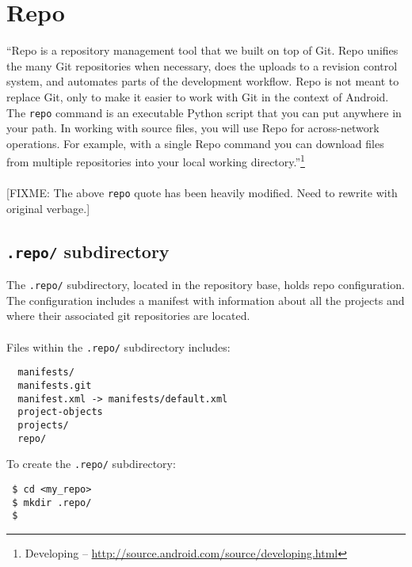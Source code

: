 \documentclass[12pt,letterpaper,dvips]{article}
\newcommand{\FIXME}[1]{\textsf{[FIXME: #1]}}
\newcommand{\cmd}[1]{\texttt{#1}}
\begin{document}
\section{Repo}
``Repo is a repository management tool that we built on top of Git.
Repo unifies the many Git repositories when necessary, does the
uploads to a revision control system, and automates parts of the
development workflow.  Repo is not meant to replace Git, only to
make it easier to work with Git in the context of Android.  The
\cmd{repo} command is an executable Python script that you can put
anywhere in your path.  In working with source files, you will use
Repo for across-network operations.  For example, with a single
Repo command you can download files from multiple repositories
into your local working directory.''\footnote{Developing -- \href{http://source.android.com/source/developing.html}{http://source.android.com/source/developing.html}}
\\
\\
\noindent \FIXME{The above \cmd{repo} quote has been heavily modified.
Need to rewrite with original verbage.}


\subsection{\cmd{.repo/} subdirectory}
The \cmd{.repo/} subdirectory, located in the repository base,
holds repo configuration.  The configuration includes a manifest
with information about all the projects and where their associated git
repositories are located.
\\
\\
Files within the \cmd{.repo/} subdirectory includes:
\begin{verbatim}
  manifests/
  manifests.git
  manifest.xml -> manifests/default.xml
  project-objects
  projects/
  repo/
\end{verbatim}
 
\noindent To create the \cmd{.repo/} subdirectory:

\begin{Verbatim}
 $ cd <my_repo>
 $ mkdir .repo/
 $ 
\end{Verbatim}

\end{document}
